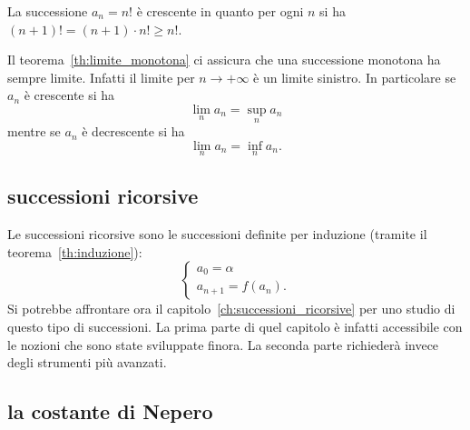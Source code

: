 \begin{example}
  La successione $a_n = n!$ è crescente 
  in quanto per ogni $n$ si ha $(n+1)! = (n+1)\cdot n! \ge n!$.
\end{example}

Il teorema~\ref{th:limite_monotona} ci assicura che una 
successione monotona ha sempre limite. 
Infatti il limite per $n\to +\infty$ è un limite sinistro.
In particolare se $a_n$ è crescente si ha 
\[
  \lim_n a_n = \sup_n a_n
\]
mentre se $a_n$ è decrescente si ha 
\[
  \lim_n a_n = \inf_n a_n.
\]


\subsection{successioni ricorsive}

Le successioni ricorsive sono le successioni
definite per induzione (tramite il teorema~\ref{th:induzione}):
\[
 \begin{cases}
   a_0 = \alpha \\
   a_{n+1} = f(a_n).
 \end{cases}
\]
Si potrebbe affrontare ora il capitolo~\ref{ch:successioni_ricorsive}
per uno studio di questo tipo di successioni.
La prima parte di quel capitolo è infatti accessibile con le nozioni
che sono state sviluppate finora.
La seconda parte richiederà invece degli strumenti più avanzati.

\subsection{la costante di Nepero}

